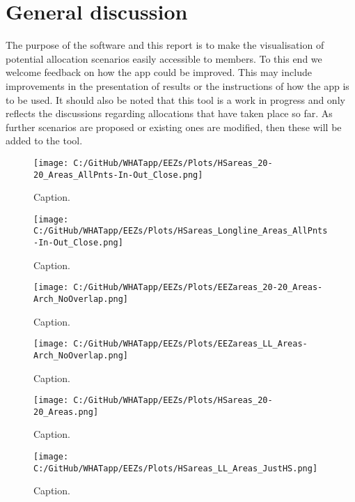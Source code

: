 \documentclass[11pt]{article}
\begin{document}
\section{General discussion}
The purpose of the software and this report is to make the visualisation of potential allocation scenarios easily accessible to members. To this end we welcome feedback on how the app could be improved. This may include improvements in the presentation of results or the instructions of how the app is to be used. It should also be noted that this tool is a work in progress and only reflects the discussions regarding allocations that have taken place so far. As further scenarios are proposed or existing ones are modified, then these will be added to the tool.



\newpage
 \begin{figure} [h]
  \centering
\texttt{[image: C:/GitHub/WHATapp/EEZs/Plots/HSareas\_20-20\_Areas\_AllPnts-In-Out\_Close.png]}
  \caption {Caption.}
  \label{fig:adjPS}
\end{figure}

\newpage
 \begin{figure} [h]
  \centering
\texttt{[image: C:/GitHub/WHATapp/EEZs/Plots/HSareas\_Longline\_Areas\_AllPnts-In-Out\_Close.png]}
  \caption {Caption.}
  \label{fig:areaLL}
\end{figure}





\newpage
 \begin{figure} [h]
  \centering
\texttt{[image: C:/GitHub/WHATapp/EEZs/Plots/EEZareas\_20-20\_Areas-Arch\_NoOverlap.png]}
  \caption {Caption.}
  \label{fig:areaPS}
\end{figure}

\newpage
 \begin{figure} [h]
  \centering
\texttt{[image: C:/GitHub/WHATapp/EEZs/Plots/EEZareas\_LL\_Areas-Arch\_NoOverlap.png]}
  \caption {Caption.}
  \label{fig:areaLL}
\end{figure}




\newpage
 \begin{figure} [h]
  \centering
\texttt{[image: C:/GitHub/WHATapp/EEZs/Plots/HSareas\_20-20\_Areas.png]}
  \caption {Caption.}
  \label{fig:HSareasPS}
\end{figure}


\newpage
 \begin{figure} [h]
  \centering
\texttt{[image: C:/GitHub/WHATapp/EEZs/Plots/HSareas\_LL\_Areas\_JustHS.png]}
  \caption {Caption.}
  \label{fig:HSareasLL}
\end{figure}
\end{document}
